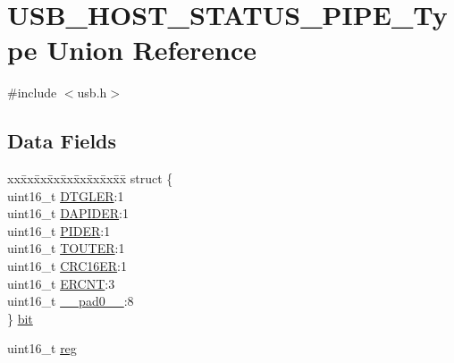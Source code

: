 \hypertarget{union_u_s_b___h_o_s_t___s_t_a_t_u_s___p_i_p_e___type}{}\section{U\+S\+B\+\_\+\+H\+O\+S\+T\+\_\+\+S\+T\+A\+T\+U\+S\+\_\+\+P\+I\+P\+E\+\_\+\+Type Union Reference}
\label{union_u_s_b___h_o_s_t___s_t_a_t_u_s___p_i_p_e___type}


{\ttfamily \#include $<$usb.\+h$>$}

\subsection*{Data Fields}
\begin{DoxyCompactItemize}
\item 
\begin{tabbing}
xx\=xx\=xx\=xx\=xx\=xx\=xx\=xx\=xx\=\kill
struct \{\\
\>uint16\_t \mbox{\hyperlink{union_u_s_b___h_o_s_t___s_t_a_t_u_s___p_i_p_e___type_a4661e272c9b4aca57b640a576b9b9020}{DTGLER}}:1\\
\>uint16\_t \mbox{\hyperlink{union_u_s_b___h_o_s_t___s_t_a_t_u_s___p_i_p_e___type_a82a197bd3227e491974bbb518436b20e}{DAPIDER}}:1\\
\>uint16\_t \mbox{\hyperlink{union_u_s_b___h_o_s_t___s_t_a_t_u_s___p_i_p_e___type_aae1147e96f035cac4251c3a01f805521}{PIDER}}:1\\
\>uint16\_t \mbox{\hyperlink{union_u_s_b___h_o_s_t___s_t_a_t_u_s___p_i_p_e___type_ac6bc715c3257704f9aef2f693c8868b4}{TOUTER}}:1\\
\>uint16\_t \mbox{\hyperlink{union_u_s_b___h_o_s_t___s_t_a_t_u_s___p_i_p_e___type_a8e4d9a3b545213e55ba9f75dbd42e8bc}{CRC16ER}}:1\\
\>uint16\_t \mbox{\hyperlink{union_u_s_b___h_o_s_t___s_t_a_t_u_s___p_i_p_e___type_a0604e8d75d23285b3e79a2a60db5fdf1}{ERCNT}}:3\\
\>uint16\_t \mbox{\hyperlink{union_u_s_b___h_o_s_t___s_t_a_t_u_s___p_i_p_e___type_a77132c2c26a75f5b8751b235cda23828}{\_\_pad0\_\_}}:8\\
\} \mbox{\hyperlink{union_u_s_b___h_o_s_t___s_t_a_t_u_s___p_i_p_e___type_a69cfa1df7f9abc3b6b3a9115084d1a64}{bit}}\\

\end{tabbing}\item 
uint16\+\_\+t \mbox{\hyperlink{union_u_s_b___h_o_s_t___s_t_a_t_u_s___p_i_p_e___type_a11760f5020019f4aa8cb02e694f7cc44}{reg}}
\end{DoxyCompactItemize}


